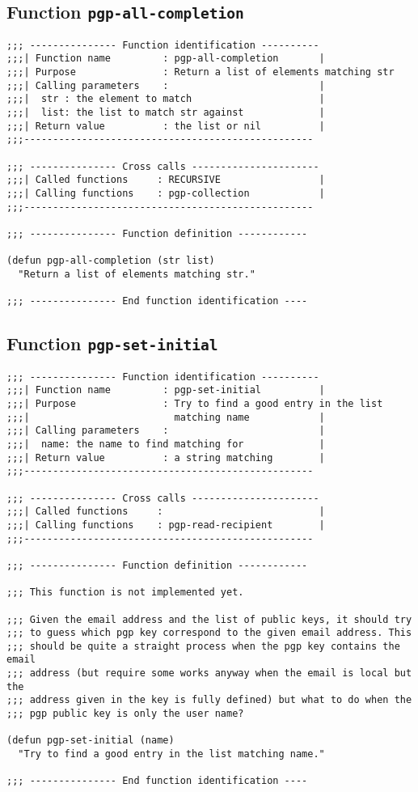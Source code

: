 \subsection{Function {\tt pgp-all-completion}}
\leavevmode
\begin{verbatim}
;;; --------------- Function identification ----------
;;;| Function name         : pgp-all-completion       |
;;;| Purpose               : Return a list of elements matching str
;;;| Calling parameters    :                          |
;;;|  str : the element to match                      |
;;;|  list: the list to match str against             |
;;;| Return value          : the list or nil          |
;;;--------------------------------------------------

;;; --------------- Cross calls ----------------------
;;;| Called functions     : RECURSIVE                 |
;;;| Calling functions    : pgp-collection            |
;;;--------------------------------------------------

;;; --------------- Function definition ------------

(defun pgp-all-completion (str list)
  "Return a list of elements matching str."

;;; --------------- End function identification ----
\end{verbatim}
\subsection{Function {\tt pgp-set-initial}}
\leavevmode
\begin{verbatim}
;;; --------------- Function identification ----------
;;;| Function name         : pgp-set-initial          |
;;;| Purpose               : Try to find a good entry in the list
;;;|                         matching name            |
;;;| Calling parameters    :                          |
;;;|  name: the name to find matching for             |
;;;| Return value          : a string matching        |
;;;--------------------------------------------------

;;; --------------- Cross calls ----------------------
;;;| Called functions     :                           |
;;;| Calling functions    : pgp-read-recipient        |
;;;--------------------------------------------------

;;; --------------- Function definition ------------

;;; This function is not implemented yet.

;;; Given the email address and the list of public keys, it should try
;;; to guess which pgp key correspond to the given email address. This
;;; should be quite a straight process when the pgp key contains the email
;;; address (but require some works anyway when the email is local but the
;;; address given in the key is fully defined) but what to do when the
;;; pgp public key is only the user name?

(defun pgp-set-initial (name)
  "Try to find a good entry in the list matching name."

;;; --------------- End function identification ----
\end{verbatim}
